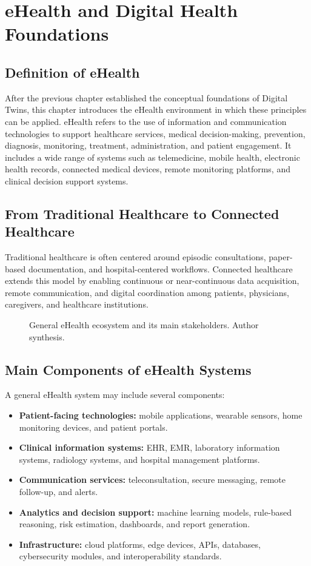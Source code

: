 \chapter{eHealth and Digital Health Foundations}

\section{Definition of eHealth}
After the previous chapter established the conceptual foundations of Digital Twins, this chapter introduces the eHealth environment in which these principles can be applied. eHealth refers to the use of information and communication technologies to support healthcare services, medical decision-making, prevention, diagnosis, monitoring, treatment, administration, and patient engagement. It includes a wide range of systems such as telemedicine, mobile health, electronic health records, connected medical devices, remote monitoring platforms, and clinical decision support systems.

\section{From Traditional Healthcare to Connected Healthcare}
Traditional healthcare is often centered around episodic consultations, paper-based documentation, and hospital-centered workflows. Connected healthcare extends this model by enabling continuous or near-continuous data acquisition, remote communication, and digital coordination among patients, physicians, caregivers, and healthcare institutions.

\begin{figure}[H]
    \centering
    \resizebox{0.92\textwidth}{!}{}
    \caption{General eHealth ecosystem and its main stakeholders. Author synthesis.}
    \label{fig:ehealth_ecosystem}
\end{figure}

\section{Main Components of eHealth Systems}
A general eHealth system may include several components:

\begin{itemize}[leftmargin=*]
    \item \textbf{Patient-facing technologies:} mobile applications, wearable sensors, home monitoring devices, and patient portals.
    \item \textbf{Clinical information systems:} EHR, EMR, laboratory information systems, radiology systems, and hospital management platforms.
    \item \textbf{Communication services:} teleconsultation, secure messaging, remote follow-up, and alerts.
    \item \textbf{Analytics and decision support:} machine learning models, rule-based reasoning, risk estimation, dashboards, and report generation.
    \item \textbf{Infrastructure:} cloud platforms, edge devices, APIs, databases, cybersecurity modules, and interoperability standards.
\end{itemize}


